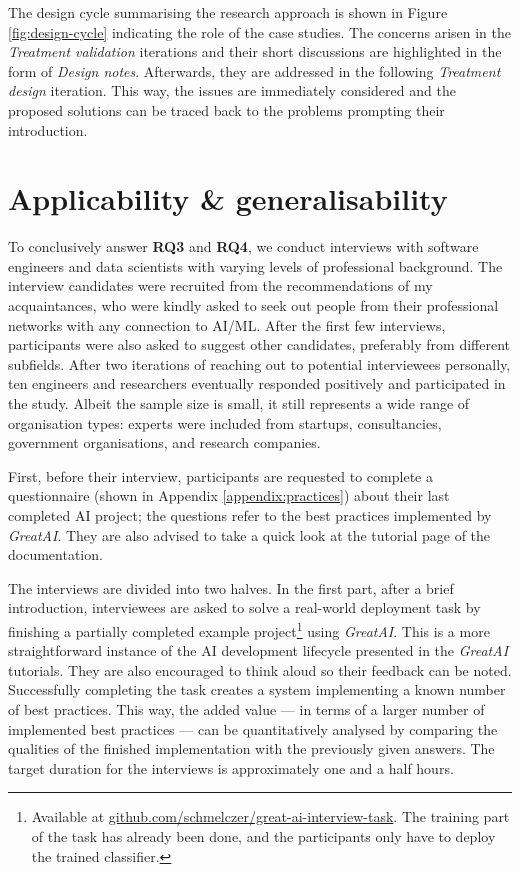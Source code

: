 The design cycle summarising the research approach is shown in Figure \ref{fig:design-cycle} indicating the role of the case studies. The concerns arisen in the \textit{Treatment validation} iterations and their short discussions are highlighted in the form of \textit{Design notes}. Afterwards, they are addressed in the following \textit{Treatment design} iteration. This way, the issues are immediately considered and the proposed solutions can be traced back to the problems prompting their introduction.

\section{Applicability \& generalisability} \label{section:interview-setup}

To conclusively answer \textbf{RQ3} and \textbf{RQ4}, we conduct interviews with software engineers and data scientists with varying levels of professional background. The interview candidates were recruited from the recommendations of my acquaintances, who were kindly asked to seek out people from their professional networks with any connection to AI/ML. After the first few interviews, participants were also asked to suggest other candidates, preferably from different subfields. After two iterations of reaching out to potential interviewees personally, ten engineers and researchers eventually responded positively and participated in the study. Albeit the sample size is small, it still represents a wide range of organisation types: experts were included from startups, consultancies, government organisations, and research companies.

First, before their interview, participants are requested to complete a questionnaire (shown in Appendix \ref{appendix:practices}) about their last completed AI project; the questions refer to the best practices implemented by \textit{GreatAI}. They are also advised to take a quick look at the tutorial page of the documentation. 

The interviews are divided into two halves. In the first part, after a brief introduction, interviewees are asked to solve a real-world deployment task by finishing a partially completed example project\footnote{Available at \href{https://github.com/schmelczer/great-ai-interview-task}{github.com/schmelczer/great-ai-interview-task}. The training part of the task has already been done, and the participants only have to deploy the trained classifier.} using \textit{GreatAI}. This is a more straightforward instance of the AI development lifecycle presented in the \textit{GreatAI} tutorials. They are also encouraged to think aloud so their feedback can be noted. Successfully completing the task creates a system implementing a known number of best practices. This way, the added value --- in terms of a larger number of implemented best practices --- can be quantitatively analysed by comparing the qualities of the finished implementation with the previously given answers. The target duration for the interviews is approximately one and a half hours.
 
